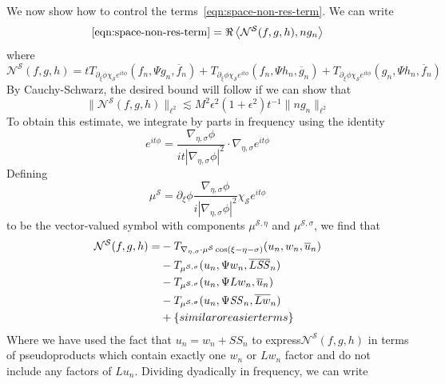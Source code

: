 \documentclass[letterpaper, reqno,final]{amsart}
\newcommand{\cS}{\mathcal{S}}
\newcommand{\mSS}{\mathit{SS}}
\newcommand{\discrAvg}{\Psi}
\newcommand{\deles}{\nabla_{\eta,\sigma}}
\newcommand{\btext}[1]{\left\{\textup{#1}\right\}}
\newcommand{\bsime}{\btext{similar or easier terms}}
\begin{document}
We now show how to control the terms~\eqref{eqn:space-non-res-term}.  We can write
\begin{equation*}
    \eqref{eqn:space-non-res-term} = \Re \left\langle \mathcal{N}^\mathcal{S}(f,g,h), ng_n \right\rangle
\end{equation*}
where
\begin{equation*}
     \mathcal{N}^\mathcal{S}(f,g,h) = t T_{\partial_\xi \phi \chi_\cS e^{it\phi}}(f_n, \discrAvg g_{n}, \overline{f}_n) + T_{\partial_\xi \phi \chi_\cS e^{it\phi}}(f_n, \discrAvg h_{n}, \overline{g}_n) + T_{\partial_\xi \phi \chi_\cS e^{it\phi}}(g_n, \discrAvg h_{n}, \overline{f}_n)
\end{equation*}
By Cauchy-Schwarz, the desired bound will follow if we can show that
\begin{equation*}
    \lVert \mathcal{N}^\mathcal{S}(f,g,h) \rVert_{\ell^2} \lesssim M^2\epsilon^2(1 + \epsilon^2) t^{-1} \lVert ng_n \rVert_{\ell^2}
\end{equation*}
To obtain this estimate, we integrate by parts in frequency using the identity 
\begin{equation*}
    e^{it\phi} = \frac{\deles \phi}{it|\deles \phi|^2} \cdot \deles e^{it\phi}
\end{equation*}
Defining 
\begin{equation*}
    \mu^\mathcal{S} = \partial_\xi \phi \frac{\deles \phi}{i|\deles \phi|^2} \chi_\cS e^{it\phi}
\end{equation*}
to be the vector-valued symbol with components $\mu^{\mathcal{S},\eta}$ and $\mu^{\mathcal{S},\sigma}$, we find that
\begin{equation}\label{eqn:m-S-first-div}\begin{split}
    \mathcal{N}^\mathcal{S}(f,g,h) =& - T_{\deles \cdot \mu^\cS \cos(\xi - \eta - \sigma)}(u_n, w_n, \overline{u}_n)\\
    &- T_{\mu^{\cS,\sigma}}(u_n, \discrAvg w_n, \overline{L\mSS}_n)\\
    &- T_{\mu^{\cS,\sigma}}(u_n, \discrAvg L w_n, \overline{u}_n)\\
    &- T_{\mu^{\cS,\sigma}}(u_n, \discrAvg \mSS_n, \overline{Lw}_n)\\
    &+ \bsime
\end{split}\end{equation}
Where we have used the fact that $u_n = w_n + \mSS_n$ to express$\mathcal{N}^\cS(f,g,h)$ in terms of pseudoproducts which contain exactly one $w_n$ or $Lw_n$ factor and do not include any factors of $Lu_n$. Dividing dyadically in frequency, we can write
\end{document}
